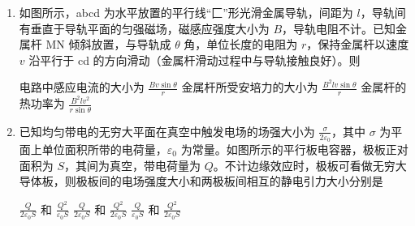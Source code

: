 \documentclass[\gkver]{gaokaozhenti}
\begin{document}
\begin{enumerate}

\item
如图所示，abcd 为水平放置的平行线“匚”形光滑金属导轨，间距为 $l$，导轨间有垂直于导轨平面的匀强磁场，磁感应强度大小为 $B$，导轨电阻不计。已知金属杆 MN 倾斜放置，与导轨成 $\theta$ 角，单位长度的电阻为 $r$，保持金属杆以速度 $v$ 沿平行于 cd 的方向滑动（金属杆滑动过程中与导轨接触良好）。则


{电路中感应电流的大小为 $\frac{Bv\sin\theta}{r}$}
{金属杆所受安培力的大小为 $\frac{B^{2}lv\sin\theta}{r}$}
{金属杆的热功率为 $\frac{B^{2}lv^{2}}{r\sin\theta}$}


\item
已知均匀带电的无穷大平面在真空中触发电场的场强大小为 $\frac{\sigma}{2\varepsilon_{0}}$，其中 $\sigma$ 为平面上单位面积所带的电荷量，$\varepsilon_{0}$ 为常量。如图所示的平行板电容器，极板正对面积为 $S$，其间为真空，带电荷量为 $Q$。不计边缘效应时，极板可看做无穷大导体板，则极板间的电场强度大小和两极板间相互的静电引力大小分别是


{$\frac{Q}{2\varepsilon_{0}S}$ 和 $\frac{Q^{2}}{\varepsilon_{0}S}$}
{$\frac{Q}{2\varepsilon_{0}S}$ 和 $\frac{Q^{2}}{2\varepsilon_{0}S}$}
{$\frac{Q}{\varepsilon_{0}S}$ 和 $\frac{Q^{2}}{2\varepsilon_{0}S}$}


\end{enumerate}
\end{document}
